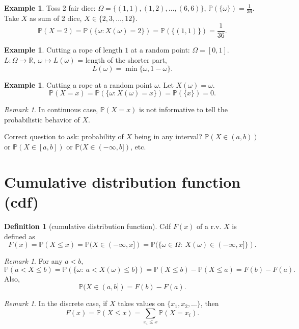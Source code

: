\documentclass[11pt]{article}
\theoremstyle{plain}
\theoremstyle{definition}
\newtheorem{definition}[theorem]{Definition}
\newtheorem{example}[theorem]{Example}
\theoremstyle{remark}
\newtheorem{remark}[theorem]{Remark}
\newcommand{\R}{\mathbb{R}}
\begin{document}
	\begin{example}
		Toss 2 fair dice:
		\(\Omega=\{(1,1),(1,2),\dots,(6,6)\}\), \(\mathbb{P}(\{\omega\})=\frac{1}{36}\).
		Take \(X\) as sum of 2 dice, \(X\in\{2,3,\dots,12\}\).
		\[
		\mathbb{P}(X=2)=\mathbb{P}(\{\omega: X(\omega)=2\})
		=\mathbb{P}(\{(1,1)\})=\frac{1}{36}.
		\]
	\end{example}
	
	\begin{example}
		Cutting a rope of length \(1\) at a random point:
		\(\Omega=[0,1]\).
		\(L:\Omega\to \R,\ \omega\mapsto L(\omega)\) = length of the shorter part,
		\[
		L(\omega)=\min\{\omega,1-\omega\}.
		\]
	\end{example}
	
	\begin{example}
		Cutting a rope at a random point \(\omega\).
		Let \(X(\omega)=\omega\).
		\[
		\mathbb{P}(X=x)=\mathbb{P}(\{\omega: X(\omega)=x\})=\mathbb{P}(\{x\})=0.
		\]
	\end{example}
	
	\begin{remark}
		In continuous case, \(\mathbb{P}(X=x)\) is not informative to tell the probabilistic behavior of \(X\).
	\end{remark}
	
	Correct question to ask: probability of \(X\) being in any interval?
	\(\mathbb{P}(X\in(a,b))\) or \(\mathbb{P}(X\in[a,b])\) or \(\mathbb{P}(X\in(-\infty,b])\), etc.
	
	\section{Cumulative distribution function (cdf)}
	
	
	
	\begin{definition}
		[cumulative distribution function] Cdf \(F(x)\) of a r.v. \(X\) is defined as
		\[
		F(x)=\mathbb{P}(X\le x)=\mathbb{P}(X\in(-\infty,x])
		=\mathbb{P}(\{\omega\in \Omega:\ X(\omega)\in(-\infty,x]\}).
		\]
	\end{definition}
	
	\begin{remark}
		For any \(a<b\),
		\[
		\mathbb{P}(a<X\le b)=\mathbb{P}(\{\omega:\ a<X(\omega)\le b\})
		=\mathbb{P}(X\le b)-\mathbb{P}(X\le a)=F(b)-F(a).
		\]
		Also,
		\[
		\mathbb{P}(X\in(a,b])=F(b)-F(a).
		\]
	\end{remark}
	
	\begin{remark}
		In the discrete case, if \(X\) takes values on \(\{x_1,x_2,\dots\}\), then
		\[
		F(x)=\mathbb{P}(X\le x)
		=\sum_{x_i\le x}\mathbb{P}(X=x_i).
		\]
	\end{remark}
	
\end{document}
